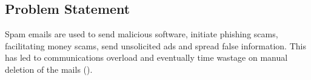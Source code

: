 \subsection{Problem Statement}
Spam emails are used to send malicious software, initiate phishing scams, facilitating money scams, send unsolicited ads and spread false information. This has led to communications overload and eventually time wastage on manual deletion of the mails (\cite{kaspersky}).
